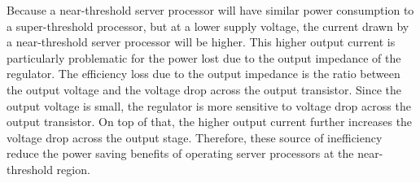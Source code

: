 Because a near-threshold server processor will have similar power consumption to a super-threshold processor, but at a lower supply voltage, the current drawn by a near-threshold server processor will be higher.
This higher output current is particularly problematic for the power lost due to the output impedance of the regulator.
The efficiency loss due to the output impedance is the ratio between the output voltage and the voltage drop across the output transistor.
Since the output voltage is small, the regulator is more sensitive to voltage drop across the output transistor.
On top of that, the higher output current further increases the voltage drop across the output stage.
Therefore, these source of inefficiency reduce the power saving benefits of operating server processors at the near-threshold region.
